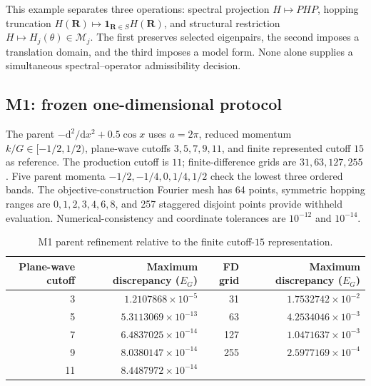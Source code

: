 \documentclass[11pt]{article}
\newcommand{\M}{\mathcal M}\newcommand{\A}{\mathcal A}\newcommand{\U}{\mathcal U}\newcommand{\HH}{\mathcal H}\newcommand{\SH}{\mathcal S_H}\newcommand{\Tr}{\operatorname{tr}}\newcommand{\dist}{\operatorname{dist}}\newcommand{\dd}{\mathrm d}
\begin{document}
This example separates three operations: spectral projection $H\mapsto PHP$, hopping truncation $H(\bm R)\mapsto\mathbf1_{\bm R\in S}H(\bm R)$, and structural restriction $H\mapsto H_j(\theta)\in\M_j$. The first preserves selected eigenpairs, the second imposes a translation domain, and the third imposes a model form. None alone supplies a simultaneous spectral--operator admissibility decision.

\subsection{M1: frozen one-dimensional protocol}\label{supp:m1}
The parent $-\dd^2/\dd x^2+0.5\cos x$ uses $a=2\pi$, reduced momentum $k/G\in[-1/2,1/2)$, plane-wave cutoffs $3,5,7,9,11$, and finite represented cutoff $15$ as reference. The production cutoff is $11$; finite-difference grids are $31,63,127,255$. Five parent momenta $-1/2,-1/4,0,1/4,1/2$ check the lowest three ordered bands. The objective-construction Fourier mesh has 64 points, symmetric hopping ranges are $0,1,2,3,4,6,8$, and 257 staggered disjoint points provide withheld evaluation. Numerical-consistency and coordinate tolerances are $10^{-12}$ and $10^{-14}$.
\begin{table}[h]\centering\small\caption{M1 parent refinement relative to the finite cutoff-$15$ representation.}\begin{tabular}{rrrr}\toprule Plane-wave cutoff & Maximum discrepancy ($E_G$) & FD grid & Maximum discrepancy ($E_G$)\\\midrule
3&$1.2107868\times10^{-5}$&31&$1.7532742\times10^{-2}$\\5&$5.3113069\times10^{-13}$&63&$4.2534046\times10^{-3}$\\7&$6.4837025\times10^{-14}$&127&$1.0471637\times10^{-3}$\\9&$8.0380147\times10^{-14}$&255&$2.5977169\times10^{-4}$\\11&$8.4487972\times10^{-14}$&&\\\bottomrule\end{tabular}\end{table}
\end{document}
